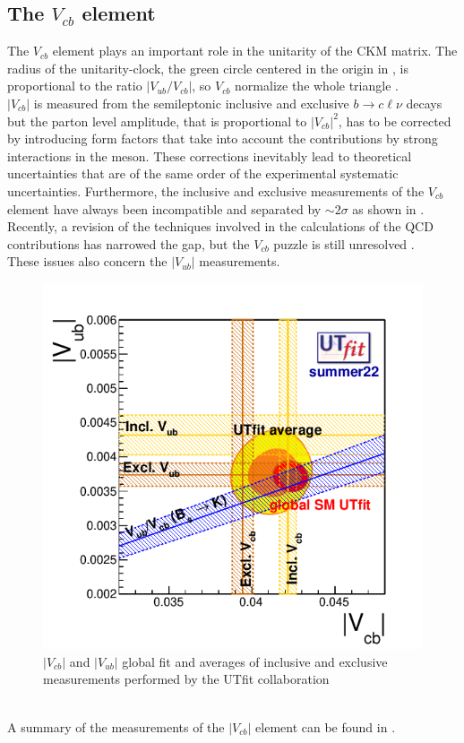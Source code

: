 \subsection{The $V_{cb}$ element}
The $V_{cb}$ element plays an important role in the unitarity of the CKM matrix. The radius of the unitarity-clock, the green circle centered in the origin in , is proportional to the ratio $|V_{ub}/V_{cb}|$, so $V_{cb}$ normalize the whole triangle \cite{Ricciardi2019DeterminationV_cb}.\\
$|V_{cb}|$ is measured from the semileptonic inclusive and exclusive $b \to c\ell\nu$
decays but the parton level amplitude, that is proportional to $|V_{cb}|^2$, has to be corrected by introducing form factors that take into account the contributions by strong interactions in the meson. These corrections inevitably lead to theoretical uncertainties that are of the same order of the experimental systematic uncertainties.
Furthermore, the inclusive and exclusive measurements of the $V_{cb}$ element have always been incompatible and separated by $\sim 2 \sigma$ as shown in . \\
Recently, a revision of the techniques involved in the calculations of the QCD contributions has narrowed the gap, but the $V_{cb}$ puzzle is still unresolved \cite{Bona2023NewScheme}.\\
These issues also concern the $|V_{ub}|$ measurements.
\\
\begin{figure}[h]
    \centering
    \includegraphics[width=0.7\linewidth]{fig//chap02-theory/vubvcb.png}
    \caption{$|V_{cb}|$ and $|V_{ub}|$ global fit and averages of inclusive and exclusive measurements performed by the UTfit collaboration \cite{Bona2023NewScheme}}
    \label{fig:vcbvub}
\end{figure}
\\
A summary of the measurements of the $|V_{cb}|$ element can be found in \cite{PDG_2022}.

